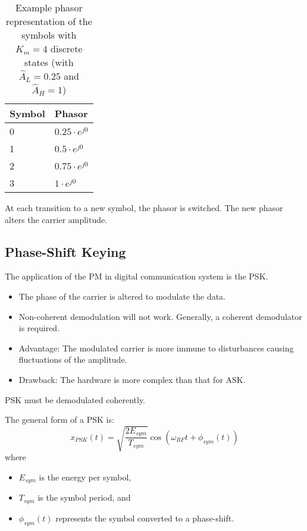 \begin{refsection}
\begin{table}[H]
	\centering
	\caption{Example phasor representation of the symbols with $K_m = 4$ discrete states (with $\hat{A}_L = 0.25$ and $\hat{A}_H = 1$)}
	\begin{tabular}{|l|l|}
		\hline
		Symbol & Phasor \\
		\hline
		\hline
		0 & $0.25 \cdot e^{j 0}$ \\
		\hline
		1 & $0.5 \cdot e^{j 0}$ \\
		\hline
		2 & $0.75 \cdot e^{j 0}$ \\
		\hline
		3 & $1 \cdot e^{j 0}$ \\
		\hline
	\end{tabular}
\end{table}

At each transition to a new symbol, the phasor is switched. The new phasor alters the carrier amplitude.

\subsection{Phase-Shift Keying}

The application of the \ac{PM} in digital communication system is the  \acf{PSK}.
\begin{itemize}
	\item The phase of the carrier is altered to modulate the data.
	\item Non-coherent demodulation will not work. Generally, a coherent demodulator is required.
	\item Advantage: The modulated carrier is more immune to disturbances causing fluctuations of the amplitude.
	\item Drawback: The hardware is more complex than that for \ac{ASK}.
\end{itemize}

\begin{fact}
	\ac{PSK} must be demodulated coherently.
\end{fact}

The general form of a \ac{PSK} is:
\begin{equation}
	x_{PSK}(t) = \sqrt{\frac{2 E_{sym}}{T_{sym}}} \cos\left(\omega_{RF} t + \phi_{sym}(t)\right)
\end{equation}
where
\begin{itemize}
	\item $E_{sym}$ is the energy per symbol,
	\item $T_{sym}$ is the symbol period, and
	\item $\phi_{sym}(t)$ represents the symbol converted to a phase-shift.
\end{itemize}


\end{refsection}
